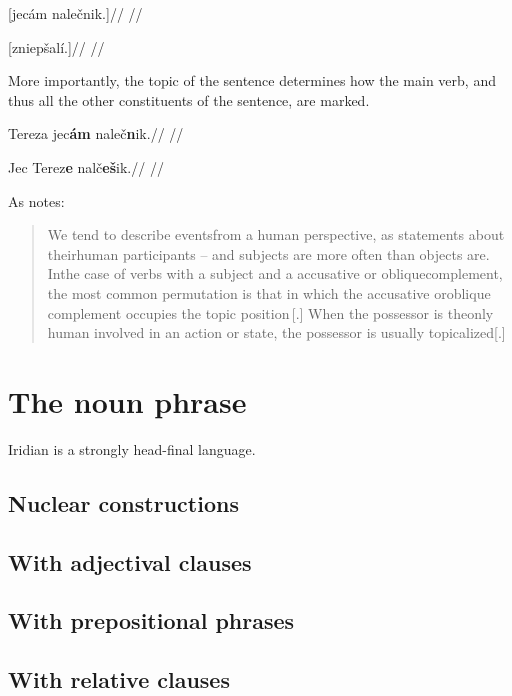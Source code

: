 \a
\begingl
\gla \relax[Tereza] [jecám nalečnik.]//
\glft {}//
\endgl

\a
\begingl
\gla \relax[Shléd] [zniepšalí.]//
\glft {}//
\endgl

\xe


More importantly, the topic of the sentence determines how the main verb, and thus all the other constituents of the sentence, are marked.

\pex
\a
\begingl
\gla Tereza jec\textbf{ám} naleč\textbf{n}ik.//
\glft {}//
\endgl

\a
\begingl
\gla Jec Terez\textbf{e} nalč\textbf{eš}ik.//
\glft {}//
\endgl

\xe

As \textcite[9]{kiss2004} notes:

\begin{quote}
  We tend to describe eventsfrom a human perspective, as statements about theirhuman participants – and subjects are more often {\sc[+human]} than objects are. Inthe case of verbs with a {\sc[–human]} subject and a {\sc[+human]} accusative or obliquecomplement,  the  most  common  permutation  is  that  in  which  the  accusative  oroblique complement occupies the topic position\,[.] When the possessor is theonly human involved in an action or state, the possessor is usually topicalized[.]
\end{quote}

\section{The noun phrase}

Iridian is a strongly head-final language.

\subsection{Nuclear constructions}
\subsection{With adjectival clauses}
\subsection{With prepositional phrases}
\subsection{With relative clauses}

